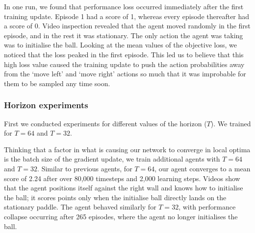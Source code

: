 \documentclass[12pt,a4paper]{article}
\begin{document}
In one run, we found that performance loss occurred immediately after the first training update. Episode 1 had a score of 1, whereas every episode thereafter had a score of 0. Video inspection revealed that the agent moved randomly in the first episode, and in the rest it was stationary. The only action the agent was taking was to initialise the ball. Looking at the mean values of the objective loss, we noticed that the loss peaked in the first episode. This led us to believe that this high loss value caused the training update to push the action probabilities away from the `move left' and `move right' actions so much that it was improbable for them to be sampled any time soon.


\subsubsection{Horizon experiments}
First we conducted experiments for different values of the horizon ($T$). We trained for $T=64$ and $T=32$. 

Thinking that a factor in what is causing our network to converge in local optima is the batch size of the gradient update, we train additional agents with $T = 64$ and $T = 32$. Similar to previous agents, for $T = 64$, our agent converges to a mean score of 2.24 after over 80,000 timesteps and 2,000 learning steps. Videos show that the agent positions itself against the right wall and knows how to initialise the ball; it scores points only when the initialise ball directly lands on the stationary paddle. The agent behaved similarly for $T = 32$, with performance collapse occurring after 265 episodes, where the agent no longer initialises the ball. 
\end{document}
